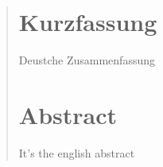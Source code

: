 \begin{abstract}
\thispagestyle{kapitelkopfzeile}


\begin{otherlanguage}{ngerman}
\section*{Kurzfassung}

Deustche Zusammenfassung

\end{otherlanguage}

\begin{otherlanguage}{english}
\section*{Abstract}

It's the english abstract

\end{otherlanguage}
\end{abstract}
